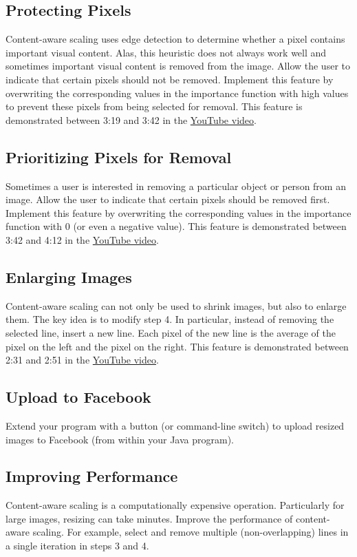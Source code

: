 \documentclass{article}
\begin{document}
\subsection*{Protecting Pixels}
Content-aware scaling uses edge detection to determine whether a pixel contains important visual content. Alas, this heuristic does not always work well and sometimes important visual content is removed from the image. Allow the user to indicate that certain pixels should not be removed. Implement this feature by overwriting the corresponding values in the importance function with high values to prevent these pixels from being selected for removal. This feature is demonstrated between 3:19 and 3:42 in the \href{http://www.youtube.com/watch?v=6NcIJXTlugc}{YouTube video}.  

\subsection*{Prioritizing Pixels for Removal}
Sometimes a user is interested in removing a particular object or person from an image. Allow the user to indicate that certain pixels should be removed first. Implement this feature by overwriting the corresponding values in the importance function with 0 (or even a negative value). This feature is demonstrated between 3:42 and 4:12 in the \href{http://www.youtube.com/watch?v=6NcIJXTlugc}{YouTube video}.  

\subsection*{Enlarging Images}
Content-aware scaling can not only be used to shrink images, but also to enlarge them. The key idea is to modify step 4. In particular, instead of removing the selected line, insert a new line. Each pixel of the new line is the average of the pixel on the left and the pixel on the right. This feature is demonstrated between 2:31 and 2:51 in the \href{http://www.youtube.com/watch?v=6NcIJXTlugc}{YouTube video}.

\subsection*{Upload to Facebook}
Extend your program with a button (or command-line switch) to upload resized images to Facebook (from within your Java program).

\subsection*{Improving Performance}
Content-aware scaling is a computationally expensive operation. Particularly for large images, resizing can take minutes. Improve the performance of content-aware scaling. For example, select and remove multiple (non-overlapping) lines in a single iteration in steps 3 and 4.
\end{document}
